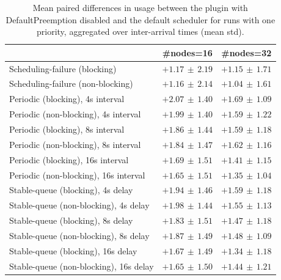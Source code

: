 \begin{table}[t]
\tiny
\setlength{\tabcolsep}{1.2pt}
\renewcommand{\arraystretch}{1.12}
\centering
\caption{Mean paired differences in usage between the plugin with DefaultPreemption disabled and the default scheduler for runs with one priority, aggregated over inter-arrival times (mean \pm std).}
\label{tab:usage-defpreempt0-prio1-std1-agg-arrival}
\begin{tabular}{l c c}
\toprule
 & \#nodes=16 & \#nodes=32 \\
\midrule
Scheduling-failure (blocking) & $+1.17\,\pm\,2.19$ & $+1.15\,\pm\,1.71$ \\
Scheduling-failure (non-blocking) & $+1.16\,\pm\,2.14$ & $+1.04\,\pm\,1.61$ \\
Periodic (blocking), 4s interval & $+2.07\,\pm\,1.40$ & $+1.69\,\pm\,1.09$ \\
Periodic (non-blocking), 4s interval & $+1.99\,\pm\,1.40$ & $+1.59\,\pm\,1.22$ \\
Periodic (blocking), 8s interval & $+1.86\,\pm\,1.44$ & $+1.59\,\pm\,1.18$ \\
Periodic (non-blocking), 8s interval & $+1.84\,\pm\,1.47$ & $+1.62\,\pm\,1.16$ \\
Periodic (blocking), 16s interval & $+1.69\,\pm\,1.51$ & $+1.41\,\pm\,1.15$ \\
Periodic (non-blocking), 16s interval & $+1.65\,\pm\,1.51$ & $+1.35\,\pm\,1.04$ \\
Stable-queue (blocking), 4s delay & $+1.94\,\pm\,1.46$ & $+1.59\,\pm\,1.18$ \\
Stable-queue (non-blocking), 4s delay & $+1.98\,\pm\,1.44$ & $+1.55\,\pm\,1.13$ \\
Stable-queue (blocking), 8s delay & $+1.83\,\pm\,1.51$ & $+1.47\,\pm\,1.18$ \\
Stable-queue (non-blocking), 8s delay & $+1.87\,\pm\,1.49$ & $+1.48\,\pm\,1.09$ \\
Stable-queue (blocking), 16s delay & $+1.67\,\pm\,1.49$ & $+1.34\,\pm\,1.18$ \\
Stable-queue (non-blocking), 16s delay & $+1.65\,\pm\,1.50$ & $+1.44\,\pm\,1.21$ \\
\bottomrule
\end{tabular}
\end{table}

